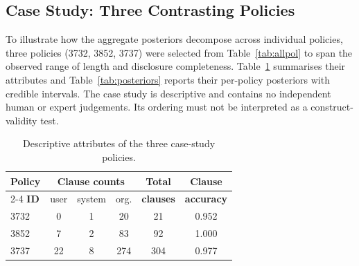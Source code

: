 \documentclass[final,3p,times,twocolumn]{elsarticle}
\begin{document}
	\subsection{Case Study: Three Contrasting Policies}
	\label{sec:casestudy} To illustrate how the aggregate posteriors decompose
	across individual policies, three policies (3732, 3852, 3737) were selected from
	Table~\ref{tab:allpol} to span the observed range of length and disclosure completeness.
	Table~\ref{tab:casestudy} summarises their attributes and Table~\ref{tab:posteriors}
	reports their per-policy posteriors with credible intervals.
	The case study is descriptive and contains no independent human or expert
	judgements. Its ordering must not be interpreted as a construct-validity test.
	\begin{table}[h]
		\centering
		\caption{Descriptive attributes of the three case-study policies.}
		\label{tab:casestudy} \footnotesize
		\setlength{\tabcolsep}{3pt}
		\begin{tabular}{@{}l ccc c c@{}}
			\toprule \textbf{Policy}       & \multicolumn{3}{c}{\textbf{Clause counts}} & \textbf{Total} & \textbf{Clause} \\
			\cmidrule(lr){2-4} \textbf{ID} & user                                       & system         & org.           & \textbf{clauses} & \textbf{accuracy} \\
			\midrule 3732                  & 0                                          & 1              & 20             & 21               & 0.952             \\
			3852                           & 7                                          & 2              & 83             & 92               & 1.000             \\
			3737                           & 22                                         & 8              & 274            & 304              & 0.977             \\
			\bottomrule
		\end{tabular}
	\end{table}
\end{document}
